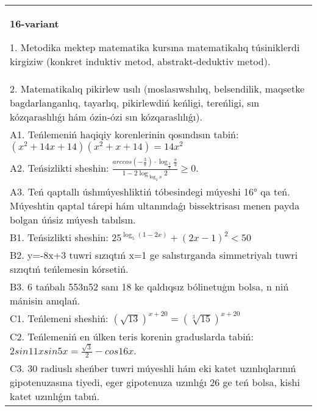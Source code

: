 \documentclass{article}
\begin{document}
\begin{tabular}{m{17cm}}
\textbf{16-variant}

1. Metodika mektep matematika kursına matematikalıq túsiniklerdi kirgiziw (konkret induktiv metod, abstrakt-deduktiv metod). \\
2. Matematikalıq pikirlew usılı (moslasıwshılıq, belsendilik, maqsetke bagdarlanganlıq, tayarlıq, pikirlewdiń keńligi, tereńligi, sın kózqaraslılıǵı hám ózin-ózi sın kózqaraslılıǵı). \\
A1. Teńlemeniń haqiqiy korenlerinin qosındısın tabiń: \((x^2 + 14x + 14) (x^2 + x + 14) = 14x^2\) \\
A2. Teńsizlikti sheshin: \(\frac{arccos (- \frac{3}{\pi}) \cdot \log_{\frac{3}{\pi}}\frac{\pi}{4}}{1 - 2\log_{\log_{2}x}2} \geq 0\). \\
A3. Teń qaptallı úshmúyeshliktiń tóbesindegi múyeshi 16° qa teń. Múyeshtin qaptal tárepi hám ultanındaǵı bissektrisası menen payda bolgan úńsiz múyesh tabılsın. \\
B1. Teńsizlikti sheshin: \(25^{\log_{5}{ (1 - 2x) }} + { (2x - 1) }^{2} < 50\) \\
B2. y=-8x+3 tuwri sızıqtıń x=1 ge salıstırganda simmetriyalı tuwri sızıqtıń teńlemesin kórsetiń. \\
B3. 6 tańbalı 553n52 sanı 18 ke qaldıqsız bólinetuģın bolsa, n niń mánisin anıqlań. \\
C1. Teńlemeni sheshiń: \((\sqrt{13}) ^{x + 20} = (\sqrt[3]{15}) ^{x + 20}\) \\
C2. Teńlemeniń en úlken teris korenin graduslarda tabiń: \(2sin11xsin5x = \frac{\sqrt{3}}{2} - cos16x\). \\
C3. 30 radiuslı sheńber tuwri múyeshli hám eki katet uzınlıqlarınıń gipotenuzasına tiyedi, eger gipotenuza uzınlıǵı 26 ge teń bolsa, kishi katet uzınlıǵın tabıń. \\

\end{tabular}
\vspace{1cm}
\end{document}
